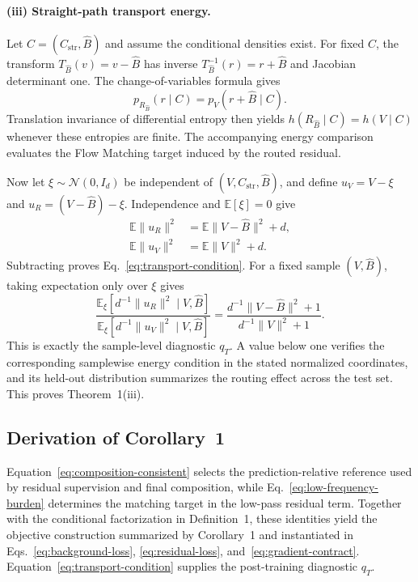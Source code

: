 \documentclass[letterpaper]{article}
\begin{document}
\paragraph{(iii) Straight-path transport energy.}
Let $C=(C_{\mathrm{str}},\hat B)$ and assume the conditional densities exist. For fixed $C$, the transform $T_{\hat B}(v)=v-\hat B$ has inverse $T_{\hat B}^{-1}(r)=r+\hat B$ and Jacobian determinant one. The change-of-variables formula gives
\begin{equation}
p_{R_{\hat B}}(r\mid C)=p_V(r+\hat B\mid C).
\end{equation}
Translation invariance of differential entropy then yields $h(R_{\hat B}\mid C)=h(V\mid C)$ whenever these entropies are finite. The accompanying energy comparison evaluates the Flow Matching target induced by the routed residual.

Now let $\xi\sim\mathcal N(0,I_d)$ be independent of $(V,C_{\mathrm{str}},\hat B)$, and define $u_V=V-\xi$ and $u_R=(V-\hat B)-\xi$. Independence and $\mathbb E[\xi]=0$ give
\begin{align}
\mathbb E\|u_R\|^2
&=
\mathbb E\|V-\hat B\|^2+d,\\
\mathbb E\|u_V\|^2
&=
\mathbb E\|V\|^2+d.
\end{align}
Subtracting proves Eq.~\ref{eq:transport-condition}. For a fixed sample $(V,\hat B)$, taking expectation only over $\xi$ gives
\begin{equation}
\frac{\mathbb E_{\xi}[d^{-1}\|u_R\|^2\mid V,\hat B]}
{\mathbb E_{\xi}[d^{-1}\|u_V\|^2\mid V,\hat B]}
=
\frac{d^{-1}\|V-\hat B\|^2+1}{d^{-1}\|V\|^2+1}.
\end{equation}
This is exactly the sample-level diagnostic $q_T$. A value below one verifies the corresponding samplewise energy condition in the stated normalized coordinates, and its held-out distribution summarizes the routing effect across the test set. This proves Theorem~1(iii).

\subsection{Derivation of Corollary~1}
Equation~\ref{eq:composition-consistent} selects the prediction-relative reference used by residual supervision and final composition, while Eq.~\ref{eq:low-frequency-burden} determines the matching target in the low-pass residual term. Together with the conditional factorization in Definition~1, these identities yield the objective construction summarized by Corollary~1 and instantiated in Eqs.~\ref{eq:background-loss}, \ref{eq:residual-loss}, and~\ref{eq:gradient-contract}. Equation~\ref{eq:transport-condition} supplies the post-training diagnostic $q_T$.
\end{document}
